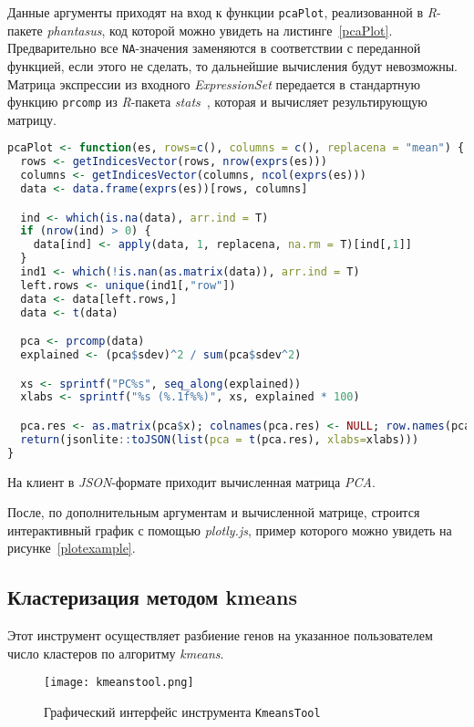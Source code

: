 Данные аргументы приходят на вход к функции \texttt{pcaPlot}, реализованной в \emph{R}-пакете \emph{phantasus}, код которой можно увидеть на листинге~\ref{pcaPlot}. Предварительно все \texttt{NA}-значения заменяются в соответствии с переданной функцией, если этого не сделать, то дальнейшие вычисления будут невозможны. Матрица экспрессии из входного \emph{ExpressionSet} передается в стандартную функцию \texttt{prcomp} из \emph{R}-пакета \emph{stats}~\cite{stats}, которая и вычисляет результирующую матрицу.
\begin{lstlisting}[float=!h,caption={Вычисление матрицы главных компонент},label={pcaPlot},language=R]
  pcaPlot <- function(es, rows=c(), columns = c(), replacena = "mean") {
  rows <- getIndicesVector(rows, nrow(exprs(es)))
  columns <- getIndicesVector(columns, ncol(exprs(es)))
  data <- data.frame(exprs(es))[rows, columns]

  ind <- which(is.na(data), arr.ind = T)
  if (nrow(ind) > 0) {
    data[ind] <- apply(data, 1, replacena, na.rm = T)[ind[,1]]
  }
  ind1 <- which(!is.nan(as.matrix(data)), arr.ind = T)
  left.rows <- unique(ind1[,"row"])
  data <- data[left.rows,]
  data <- t(data)

  pca <- prcomp(data)
  explained <- (pca$sdev)^2 / sum(pca$sdev^2)

  xs <- sprintf("PC%s", seq_along(explained))
  xlabs <- sprintf("%s (%.1f%%)", xs, explained * 100)

  pca.res <- as.matrix(pca$x); colnames(pca.res) <- NULL; row.names(pca.res) <- NULL
  return(jsonlite::toJSON(list(pca = t(pca.res), xlabs=xlabs)))
}
\end{lstlisting}

На клиент в \emph{JSON}-формате приходит вычисленная матрица \emph{PCA}.

После, по дополнительным аргументам и вычисленной матрице, строится интерактивный график с помощью \emph{plotly.js}, пример которого можно увидеть на рисунке~\ref{plotexample}.

\subsection{Кластеризация методом kmeans}
Этот инструмент осуществляет разбиение генов на указанное пользователем число кластеров по алгоритму \emph{kmeans}.

\begin{figure}[h]
  \caption{Графический интерфейс инструмента \texttt{KmeansTool}}
  \texttt{[image: kmeanstool.png]}
   \label{kmeanstool}
\end{figure}

